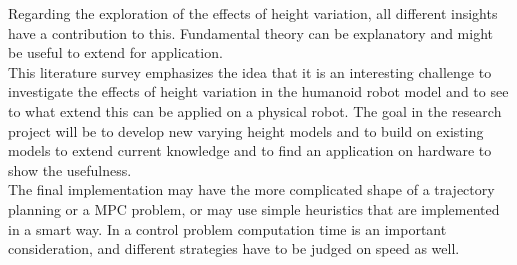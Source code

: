 Regarding the exploration of the effects of height variation, all different insights have a contribution to this. Fundamental theory can be explanatory and might be useful to extend for application. \\
This literature survey emphasizes the idea that it is an interesting challenge to investigate the effects of height variation in the humanoid robot model and to see to what extend this can be applied on a physical robot. The goal in the research project will be to develop new varying height models and to build on existing models to extend current knowledge and to find an application on hardware to show the usefulness.\\
The final implementation may have the more complicated shape of a trajectory planning or a \ac{MPC} problem, or may use simple heuristics that are implemented in a smart way. In a control problem computation time is an important consideration, and different strategies have to be judged on speed as well. 